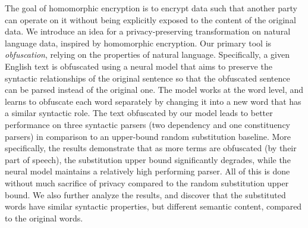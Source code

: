 The goal of homomorphic encryption is to encrypt data such that another party can operate on it without being explicitly exposed to the content of the original data. We introduce an idea for a privacy-preserving transformation on natural language data, inspired by homomorphic encryption. Our primary tool is {\em obfuscation}, relying on the properties of natural language. Specifically, a given English text is obfuscated using a neural model that aims to preserve the syntactic relationships of the original sentence so that the obfuscated sentence can be parsed instead of the original one. The model works at the word level, and learns to obfuscate each word separately by changing it into a new word that has a similar syntactic role. The text obfuscated by our model leads to better performance on three syntactic parsers (two dependency and one constituency parsers) in comparison to an upper-bound random substitution baseline. More specifically, the results demonstrate that as more terms are obfuscated (by their part of speech), the substitution upper bound significantly degrades, while the neural model maintains a relatively high performing parser. All of this is done without much sacrifice of privacy compared to the random substitution upper bound. We also further analyze the results, and discover that the substituted words have similar syntactic properties, but different semantic content, compared to the original words.
